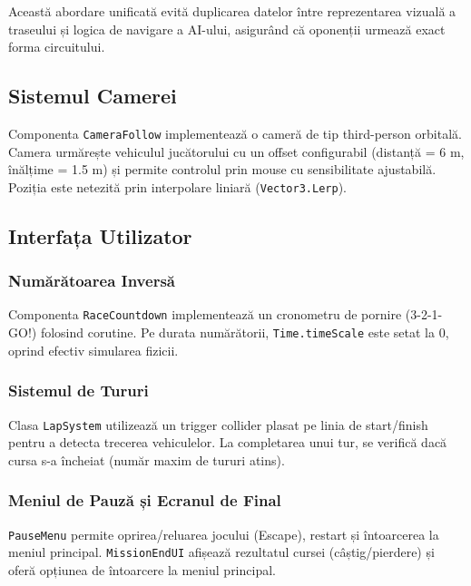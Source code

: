 \documentclass[11pt,twocolumn]{article}
\begin{document}
Această abordare unificată evită duplicarea datelor între reprezentarea vizuală a traseului și logica de navigare a AI-ului, asigurând că oponenții urmează exact forma circuitului.

\subsection{Sistemul Camerei}

Componenta \texttt{CameraFollow} implementează o cameră de tip third-person orbitală. Camera urmărește vehiculul jucătorului cu un offset configurabil (distanță = 6 m, înălțime = 1.5 m) și permite controlul prin mouse cu sensibilitate ajustabilă. Poziția este netezită prin interpolare liniară (\texttt{Vector3.Lerp}).

\subsection{Interfața Utilizator}

\subsubsection{Numărătoarea Inversă}

Componenta \texttt{RaceCountdown} implementează un cronometru de pornire (3-2-1-GO!) folosind corutine. Pe durata numărătorii, \texttt{Time.timeScale} este setat la 0, oprind efectiv simularea fizicii.

\subsubsection{Sistemul de Tururi}

Clasa \texttt{LapSystem} utilizează un trigger collider plasat pe linia de start/finish pentru a detecta trecerea vehiculelor. La completarea unui tur, se verifică dacă cursa s-a încheiat (număr maxim de tururi atins).

\subsubsection{Meniul de Pauză și Ecranul de Final}

\texttt{PauseMenu} permite oprirea/reluarea jocului (Escape), restart și întoarcerea la meniul principal. \texttt{MissionEndUI} afișează rezultatul cursei (câștig/pierdere) și oferă opțiunea de întoarcere la meniul principal.

\end{document}
